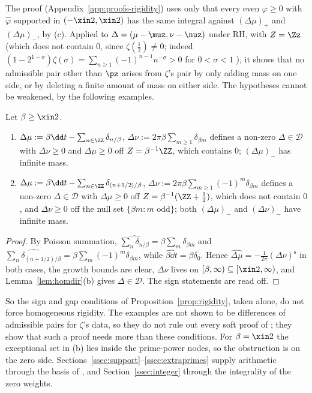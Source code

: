 The proof (Appendix~\ref{app:proofs-rigidity}) uses only that every even $\varphi\ge0$ with $\widehat\varphi$ supported in
$(-\xin2,\xin2)$ has the same integral against $(\Delta\mu)_+$ and $(\Delta\mu)_-$, by (c). Applied to $\Delta=(\mu-\muz,\nu-\nuz)$
under RH, with $Z=\Zz$ (which does not contain $0$, since $\zeta(\frac12)\ne0$; indeed $(1-2^{1-\sigma})\zeta(\sigma)=\sum_{n\ge1}(-1)^{n-1}n^{-\sigma}>0$
for $0<\sigma<1$ \cite[(25.2.3)]{DLMF}), it shows that no admissible pair other than $\pz$ arises from $\zeta$'s pair by only adding mass
on one side, or by deleting a finite amount of mass on either side. The hypotheses cannot be weakened, by the following examples.

\begin{proposition}
Let $\beta\ge\xin2$.
\begin{enumerate}[label=\textup{(\alph*)}]
\item $\Delta\mu:=\beta\dd t-\sum_{n\in\ZZ}\delta_{n/\beta}$, $\Delta\nu:=2\pi\beta\sum_{m\ge1}\delta_{\beta m}$ defines a non-zero
$\Delta\in\mathcal D$ with $\Delta\nu\ge0$ and $\Delta\mu\ge0$ off $Z=\beta^{-1}\ZZ$, which contains $0$; $(\Delta\mu)_-$ has infinite mass.
\item $\Delta\mu:=\beta\dd t-\sum_{n\in\ZZ}\delta_{(n+1/2)/\beta}$, $\Delta\nu:=2\pi\beta\sum_{m\ge1}(-1)^m\delta_{\beta m}$ defines a non-zero
$\Delta\in\mathcal D$ with $\Delta\mu\ge0$ off $Z=\beta^{-1}(\ZZ+\frac12)$, which does not contain $0$, and $\Delta\nu\ge0$ off the null
set $\{\beta m:m\text{ odd}\}$; both $(\Delta\mu)_-$ and $(\Delta\nu)_-$ have infinite mass.
\end{enumerate}
\end{proposition}

\begin{proof}
By Poisson summation, $\widehat{\sum_n\delta_{n/\beta}}=\beta\sum_m\delta_{\beta m}$ and
$\widehat{\sum_n\delta_{(n+1/2)/\beta}}=\beta\sum_m(-1)^m\delta_{\beta m}$, while $\widehat{\beta\dd t}=\beta\delta_0$. Hence
$\widehat{\Delta\mu}=-\frac1{2\pi}(\Delta\nu)^{\mathrm s}$ in both cases, the growth bounds are clear, $\Delta\nu$ lives on
$[\beta,\infty)\subseteq[\xin2,\infty)$, and Lemma~\ref{lem:homdir}(b) gives $\Delta\in\mathcal D$. The sign statements are read off.
\end{proof}

So the sign and gap conditions of Proposition~\ref{prop:rigidity}, taken alone, do not force homogeneous rigidity. The examples are not
shown to be differences of admissible pairs for $\zeta$'s data, so they do not rule out every soft proof of \condU; they show that such a
proof needs more than these conditions. For $\beta=\xin2$ the exceptional set in (b) lies inside the prime-power nodes, so the obstruction
is on the zero side. Sections~\ref{ssec:support}--\ref{ssec:extraprimes} supply arithmetic through the basis of \cite{BRS}, and
Section~\ref{ssec:integer} through the integrality of the zero weights.

